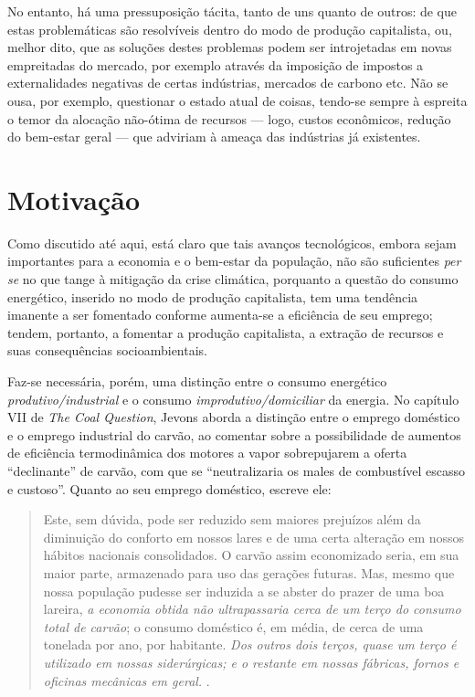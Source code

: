 No entanto, há uma pressuposição tácita, tanto de uns quanto de outros: de que estas problemáticas são resolvíveis dentro do modo de produção capitalista, ou, melhor dito, que as soluções destes problemas podem ser introjetadas em novas empreitadas do mercado, por exemplo através da imposição de impostos a externalidades negativas de certas indústrias, mercados de carbono etc. Não se ousa, por exemplo, questionar o estado atual de coisas, tendo-se sempre à espreita o temor da alocação não-ótima de recursos --- logo, custos econômicos, redução do bem-estar geral --- que adviriam à ameaça das indústrias já existentes.


\section{Motivação}
Como discutido até aqui, está claro que tais avanços tecnológicos, embora sejam importantes para a economia e o bem-estar da população, não são suficientes \textit{per se} no que tange à mitigação da crise climática, porquanto a questão do consumo energético, inserido no modo de produção capitalista, tem uma tendência imanente a ser fomentado conforme aumenta-se a eficiência de seu emprego; tendem, portanto, a fomentar a produção capitalista, a extração de recursos e suas consequências socioambientais.

Faz-se necessária, porém, uma distinção entre o consumo energético \textit{produtivo/industrial} e o consumo \textit{improdutivo/domiciliar} da energia. No capítulo VII de \textit{The Coal Question}, Jevons aborda a distinção entre o emprego doméstico e o emprego industrial do carvão, ao comentar sobre a possibilidade de aumentos de eficiência termodinâmica dos motores a vapor sobrepujarem a oferta ``declinante'' de carvão, com que se ``neutralizaria os males de combustível escasso e custoso''. Quanto ao seu emprego doméstico, escreve ele:
\begin{quote}
    Este, sem dúvida, pode ser reduzido sem maiores prejuízos além da diminuição do conforto em nossos lares e de uma certa alteração em nossos hábitos nacionais consolidados. O carvão assim economizado seria, em sua maior parte, armazenado para uso das gerações futuras. Mas, mesmo que nossa população pudesse ser induzida a se abster do prazer de uma boa lareira, \textit{a economia obtida não ultrapassaria cerca de um terço do consumo total de carvão}; o consumo doméstico é, em média, de cerca de uma tonelada por ano, por habitante. \textit{Dos outros dois terços, quase um terço é utilizado em nossas siderúrgicas; e o restante em nossas fábricas, fornos e oficinas mecânicas em geral.} \parencite[p. 75, grifo meu]{Jevons1866}.
\end{quote}

